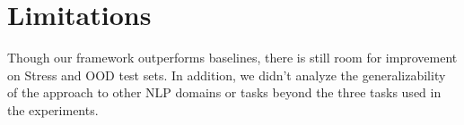 \section*{Limitations}
Though our framework outperforms baselines, there is still room for improvement on Stress and OOD test sets.   
In addition, we didn't analyze the generalizability of the approach to other NLP domains or tasks beyond the three tasks used in the experiments.  
